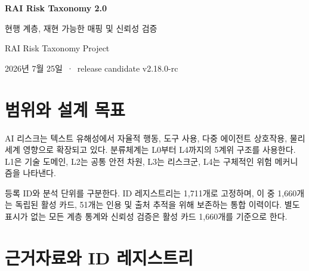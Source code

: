 \documentclass[11pt,a4paper]{article}
\begin{document}
\begin{center}
{\LARGE\bfseries RAI Risk Taxonomy 2.0\par}
\vspace{4pt}
{\large 현행 계층, 재현 가능한 매핑 및 신뢰성 검증\par}
\vspace{8pt}
{\large RAI Risk Taxonomy Project\par}
\vspace{2pt}
2026년 7월 25일 \,·\, release candidate v2.18.0-rc
\end{center}

\begin{abstract}
\noindent
RAI Risk Taxonomy 2.0은 General-purpose AI, Agentic AI, Physical AI의
책임 AI 리스크를 통합한다. 현행 릴리스는 등록 ID 1,711개를 보존하면서 독립된
활성 L4 카드 1,660개와 통합 이력 51개를 구분한다. 표준 기반 상위 구조와 문헌
기반 L4 발굴을 결합한 Hybrid 접근을 사용했으며, 현재 계층은 의미 L2 3개와
의미 L3 54개로 구성된다. General AI에는 사회적 파급 관련 L3 4개를 신설했고,
기존 Physical AI의 사회적 영향 L3 9개는 General 사회적 파급 아래로 이동했다.
L4 배치는 BGE-M3 임베딩, L3 정의, 군집 중심점, 키워드 유사도 및 도메인 제약을
결합해 수행한다. 입력 파일 해시, 모델 스냅샷, 난수 시드, 반복 이력 및 불변조건
검사를 통해 재현성을 관리한다. 활성 카드 전체에서 구면 EM은 20회에 수렴했고
평균 코사인 목적함수는 0.8005였다. Top-1 일치율은 71.9\%, Top-5 일치율은
95.2\%였다. 본 보고서는 현재 결과와 재현 절차를 중심으로 기술하며, 경계 사례는
후속 휴먼 검토 대상으로 유지한다.
\end{abstract}

\section{범위와 설계 목표}

AI 리스크는 텍스트 유해성에서 자율적 행동, 도구 사용, 다중 에이전트 상호작용,
물리 세계 영향으로 확장되고 있다. 분류체계는 L0부터 L4까지의 5계위 구조를
사용한다. L1은 기술 도메인, L2는 공통 안전 차원, L3는 리스크군, L4는 구체적인
위험 메커니즘을 나타낸다.

등록 ID와 분석 단위를 구분한다. ID 레지스트리는 1,711개로 고정하며, 이 중
1,660개는 독립된 활성 카드, 51개는 인용 및 출처 추적을 위해 보존하는 통합
이력이다. 별도 표시가 없는 모든 계층 통계와 신뢰성 검증은 활성 카드 1,660개를
기준으로 한다.

\section{근거자료와 ID 레지스트리}
\end{document}
